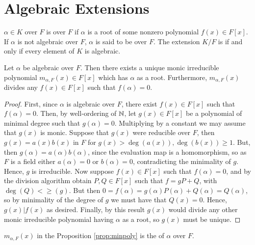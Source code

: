 \section{ Algebraic Extensions}

\begin{definition}
    $\alpha \in K$ over $F$ is  over $F$ if $\alpha$ is a root of some nonzero polynomial $f(x) \in F[x]$. If $\alpha$ is not algebraic over $F$, $\alpha$ is said to be  over $F$. The extension $K/F$ is  if and only if every element of $K$ is algebraic.
\end{definition}


\begin{proposition}\label{prop:minpoly}
    Let $\alpha$ be algebraic over $F$. Then there exists a unique monic irreducible polynomial $m_{\alpha,F}(x) \in F[x]$ which has $\alpha$ as a root. Furthermore, $m_{\alpha,F}(x)$ divides any $f(x) \in F[x]$ such that $f(\alpha) = 0$.
\end{proposition}
\begin{proof}
    First, since $\alpha$ is algebraic over $F$, there exist $f(x) \in F[x]$ such that $f(\alpha) = 0$. Then, by well-ordering of $\mathbb N$, let $g(x) \in F[x]$ be a polynomial of minimal degree such that $g(\alpha) = 0$. Multiplying by a constant we may assume that $g(x)$ is monic. Suppose that $g(x)$ were reducible over $F$, then $g(x) = a(x)b(x)$ in $F$ for $g(x) > \deg(a(x)),\deg(b(x)) \geq 1$. But, then $g(\alpha) = a(\alpha)b(\alpha)$, since the evaluation map is a homomorphism, so as $F$ is a field either $a(\alpha) = 0$ or $b(\alpha) = 0$, contradicting the minimality of $g$. Hence, $g$ is irreducible. Now suppose $f(x) \in F[x]$ such that $f(\alpha) = 0$, and by the division algorithm obtain $P,Q \in F[x]$ such that $f = gP+Q$, with $\deg(Q) < \geq (g)$. But then $0=f(\alpha)=g(\alpha)P(\alpha)+Q(\alpha)=Q(\alpha)$, so by minimality of the degree of $g$ we must have that $Q(x) = 0$. Hence, $g(x)\vert f(x)$ as desired. Finally, by this result $g(x)$ would divide any other monic irreducible polynomial having $\alpha$ as a root, so $g(x)$ must be unique.
\end{proof}



\begin{definition}
    $m_{\alpha,F}(x)$ in the Proposition \ref{prop:minpoly} is the  of $\alpha$ over $F$.
\end{definition}


